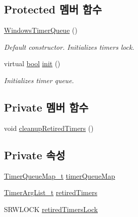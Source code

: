 \subsection*{Protected 멤버 함수}
\begin{DoxyCompactItemize}
\item 
\hyperlink{class_windows_timer_queue_a77a63eea358550d968cb01071e57c224}{Windows\+Timer\+Queue} ()
\begin{DoxyCompactList}\small\item\em Default constructor. Initializes timers lock. \end{DoxyCompactList}\item 
virtual \hyperlink{avb__gptp_8h_af6a258d8f3ee5206d682d799316314b1}{bool} \hyperlink{class_o_s_timer_queue_ac4ae554e242cee73c504038d88855eba}{init} ()
\begin{DoxyCompactList}\small\item\em Initializes timer queue. \end{DoxyCompactList}\end{DoxyCompactItemize}
\subsection*{Private 멤버 함수}
\begin{DoxyCompactItemize}
\item 
void \hyperlink{class_windows_timer_queue_ae9a5e12891792c8a3233e9c13a83f729}{cleanup\+Retired\+Timers} ()
\end{DoxyCompactItemize}
\subsection*{Private 속성}
\begin{DoxyCompactItemize}
\item 
\hyperlink{windows__hal_8hpp_a9697083f507a6e04711614c6703bea3e}{Timer\+Queue\+Map\+\_\+t} \hyperlink{class_windows_timer_queue_a42c6710e44f775bc9ad0df4aa1dd4fa8}{timer\+Queue\+Map}
\item 
\hyperlink{windows__hal_8hpp_a52f8033c0b50f46374156ec8180abde4}{Timer\+Arg\+List\+\_\+t} \hyperlink{class_windows_timer_queue_a1d247e5dc6ff5761a49ce7376ae9277d}{retired\+Timers}
\item 
S\+R\+W\+L\+O\+CK \hyperlink{class_windows_timer_queue_a756b0f925bf4252e4b3782fb2eb179f4}{retired\+Timers\+Lock}
\end{DoxyCompactItemize}
